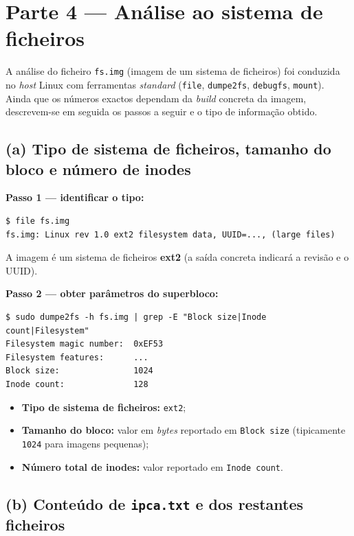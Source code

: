 \documentclass[11pt,a4paper]{article}
\begin{document}
\section{Parte 4 --- Análise ao sistema de ficheiros}

A análise do ficheiro \texttt{fs.img} (imagem de um sistema de ficheiros) foi conduzida no \textit{host} Linux com ferramentas \textit{standard} (\texttt{file}, \texttt{dumpe2fs}, \texttt{debugfs}, \texttt{mount}). Ainda que os números exactos dependam da \textit{build} concreta da imagem, descrevem-se em seguida os passos a seguir e o tipo de informação obtido.

\subsection{(a) Tipo de sistema de ficheiros, tamanho do bloco e número de inodes}

\textbf{Passo 1 --- identificar o tipo:}

\begin{lstlisting}[style=shellstyle]
$ file fs.img
fs.img: Linux rev 1.0 ext2 filesystem data, UUID=..., (large files)
\end{lstlisting}

A imagem é um sistema de ficheiros \textbf{ext2} (a saída concreta indicará a revisão e o UUID).

\textbf{Passo 2 --- obter parâmetros do superbloco:}

\begin{lstlisting}[style=shellstyle]
$ sudo dumpe2fs -h fs.img | grep -E "Block size|Inode count|Filesystem"
Filesystem magic number:  0xEF53
Filesystem features:      ...
Block size:               1024
Inode count:              128
\end{lstlisting}

\begin{itemize}[leftmargin=1.5em]
    \item \textbf{Tipo de sistema de ficheiros:} \texttt{ext2};
    \item \textbf{Tamanho do bloco:} valor em \textit{bytes} reportado em \texttt{Block size} (tipicamente \texttt{1024} para imagens pequenas);
    \item \textbf{Número total de inodes:} valor reportado em \texttt{Inode count}.
\end{itemize}

\subsection{(b) Conteúdo de \texttt{ipca.txt} e dos restantes ficheiros}
\end{document}
